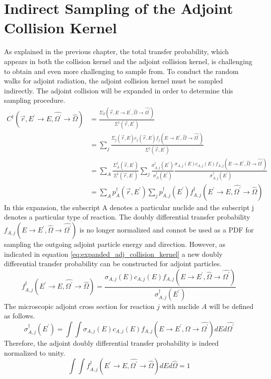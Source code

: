 \section{Indirect Sampling of the Adjoint Collision Kernel}
As explained in the previous chapter, the total transfer probability, which
appears in both the collision kernel and the adjoint collision kernel, is
challenging to obtain and even more challenging to sample from. To conduct
the random walks for adjoint radiation, the adjoint collision kernel 
must be sampled indirectly. The adjoint collision will be expanded in order
to determine this sampling procedure. 
\begin{align}
  C^{\dagger}(\vec{r},E^{'} \to E,\hat{\Omega^{'}} \to \hat{\Omega}) & =
  \frac{\Sigma_T(\vec{r},E \to E^{'},\hat{\Omega} \to \hat{\Omega^{'}})}
       {\Sigma^{\dagger}(\vec{r},E^{'})} \nonumber \\
       & = \sum_j 
       \frac{\Sigma_{j}(\vec{r},E)c_j(\vec{r},E)
         f_j(E \to E^{'},\hat{\Omega} \to \hat{\Omega^{'}})}
            {\Sigma^{\dagger}(\vec{r},E^{'})} \nonumber \\
  & = \sum_A \frac{\Sigma_A^{\dagger}(\vec{r},E^{'})}
                  {\Sigma^{\dagger}(\vec{r},E^{'})}
  \sum_j \frac{\sigma_{A,j}^{\dagger}(E^{'})}{\sigma_A^{\dagger}(E^{'})}
  \frac{\sigma_{A,j}(E) c_{A,j}(E) 
        f_{A,j}(E \to E^{'},\hat{\Omega} \to \hat{\Omega^{'}})}
       {\sigma_{A,j}^{\dagger}(E^{'})} \nonumber \\
  & = \sum_A p_A^{\dagger}(\vec{r},E^{'}) \sum_j p_{A,j}^{\dagger}(E^{'})
       f_{A,j}^{\dagger}(E^{'} \to E,\hat{\Omega^{'}} \to \hat{\Omega})
  \label{eq:expanded_adj_collision_kernel}
\end{align}
In this expansion, the subscript A denotes a particular nuclide and the
subscript j denotes a particular type of reaction. The doubly differential
transfer probability $f_{A,j}(E \to E^{'},\hat{\Omega} \to \hat{\Omega^{'}})$
is no longer normalized and connot be used as a PDF for sampling the outgoing
adjoint particle energy and direction. However, as indicated in equation
\ref{eq:expanded_adj_collision_kernel} a new doubly differential transfer
probability can be constructed for adjoint particles. 
\begin{equation}
  f_{A,j}^{\dagger}(E^{'} \to E,\hat{\Omega^{'}} \to \hat{\Omega}) = 
  \frac{\sigma_{A,j}(E)c_{A,j}(E) 
    f_{A,j}(E \to E^{'},\hat{\Omega} \to \hat{\Omega^{'}})}
       {\sigma_{A,j}^{\dagger}(E^{'})}
\end{equation}
The microscopic adjoint cross section for reaction $j$ with nuclide $A$ will
be defined as follows.
\begin{equation}
  \sigma_{A,j}^{\dagger}(E^{'}) = \int\int
  \sigma_{A,j}(E)c_{A,j}(E) 
    f_{A,j}(E \to E^{'},\hat{\Omega} \to \hat{\Omega^{'}}) dE d\hat{\Omega^{'}}
\end{equation}
Therefore, the adjoint doubly differential transfer probability is indeed 
normalized to unity.
\begin{equation}
  \int\int f_{A,j}^{\dagger}(E^{'} \to E,\hat{\Omega^{'}} \to \hat{\Omega})
  dE d\hat{\Omega} = 1
\end{equation}

